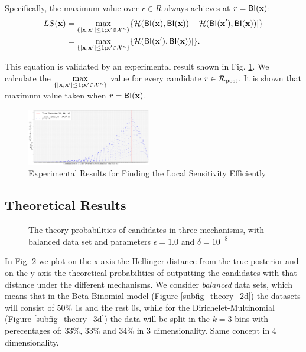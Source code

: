 \documentclass{article}
\begin{document}
Specifically, the maximum value over ${r \in R}$ always achieves at $r = \mathsf{BI}(\textbf{x})$:
\begin{equation*}
\begin{split}
LS(\textbf{x}) 
  & = \max\limits_{\{|\textbf{x},\textbf{x}'| \leq 1;\textbf{x}'\in \mathcal{X}^n\}} \{\mathcal{H}(\mathsf{BI}(\textbf{x}), \mathsf{BI}(\textbf{x})) - \mathcal{H}(\mathsf{BI}(\textbf{x}'), \mathsf{BI}(\textbf{x}))|\} \\
  & = \max\limits_{\{|\textbf{x},\textbf{x}'| \leq 1;\textbf{x}'\in \mathcal{X}^n\}} \{\mathcal{H}(\mathsf{BI}(\textbf{x}'), \mathsf{BI}(\textbf{x}))|\}.
\end{split}
\end{equation*}

This equation is validated by an experimental result shown in Fig. \ref{fig_efficiency}. We calculate the $\max\limits_{\{|\textbf{x},\textbf{x}'| \leq 1;\textbf{x}'\in \mathcal{X}^n\}}$ value for every candidate $r \in \mathcal{R}_{\textup{post}}$. It is shown that maximum value taken when  $r = \mathsf{BI}(\textbf{x})$.

\begin{figure}[ht]
\centering
\includegraphics[width=0.48\textwidth]{efficiency}
\caption{Experimental Results for Finding the Local Sensitivity Efficiently}
\label{fig_efficiency}
\end{figure}

\subsection{Theoretical Results}

\begin{figure}
\begin{center}
\centering
\caption{The theory probabilities of candidates in three mechanisms, with balanced data set and parameters $\epsilon = 1.0$ and $\delta = 10^{-8}$ }
\label{fig_theory}
\end{center}
\end{figure}
In Fig. \ref{fig_theory} we plot on the x-axis the Hellinger distance from the true posterior and on the y-axis the theoretical probabilities of outputting the candidates with that distance under the different mechanisms. We consider \emph{balanced} data sets, which means that in the Beta-Binomial model (Figure \ref{subfig_theory_2d}) the datasets will consist of 50\% 1s and the rest 0s, while for the
Dirichelet-Multinomial (Figure  \ref{subfig_theory_3d})
the data will be split in the $k=3$ bins with perecentages of: 33\%, 33\% and 34\% in 3 dimensionality. Same concept in 4 dimensionality.
\end{document}
